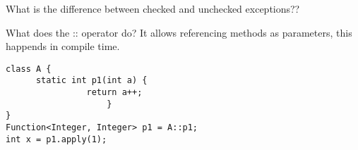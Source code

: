 \documentclass[avery5371,grid]{flashcards}
\begin{document}
\begin{flashcard}[Lang]{What is the difference between checked and unchecked exceptions??}
\begin{flashcard}[Lang]{What does the :: operator do?}
It allows referencing methods as parameters, this happends in compile time.

\begin{lstlisting}[frame=single]
class A {
      static int p1(int a) {
                return a++;
                    }
}
Function<Integer, Integer> p1 = A::p1;
int x = p1.apply(1);
\end{lstlisting}

\end{flashcard}


\end{flashcard}
\end{document}
